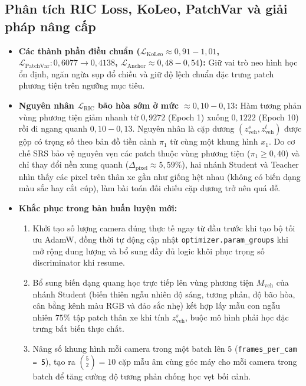 \documentclass[11pt,a4paper]{article}
\begin{document}
\subsection{Phân tích RIC Loss, KoLeo, PatchVar và giải pháp nâng cấp}
\begin{itemize}
    \item \textbf{Các thành phần điều chuẩn ($\mathcal{L}_{\text{KoLeo}} \approx 0{,}91 - 1{,}01$, $\mathcal{L}_{\text{PatchVar}}: 0{,}6077 \to 0{,}4138$, $\mathcal{L}_{\text{Anchor}} \approx 0{,}48 - 0{,}54$):} Giữ vai trò neo hình học ổn định, ngăn ngừa sụp đổ chiều và giữ độ lệch chuẩn đặc trưng patch phương tiện trên ngưỡng mục tiêu.
    \item \textbf{Nguyên nhân $\mathcal{L}_{\text{RIC}}$ bão hòa sớm ở mức $\approx 0{,}10 - 0{,}13$:} Hàm tương phản vùng phương tiện giảm nhanh từ $0{,}9272$ (Epoch 1) xuống $0{,}1222$ (Epoch 10) rồi đi ngang quanh $0{,}10 - 0{,}13$. Nguyên nhân là cặp dương $(z_{\text{veh}}^s, z_{\text{veh}}^t)$ được gộp có trọng số theo bản đồ tiền cảnh $\pi_1$ từ cùng một khung hình $x_1$. Do cơ chế SRS bảo vệ nguyên vẹn các patch thuộc vùng phương tiện ($\pi_1 \ge 0{,}40$) và chỉ thay đổi nền xung quanh ($\Delta_{\text{pixel}} \approx 5{,}59\%$), hai nhánh Student và Teacher nhìn thấy các pixel trên thân xe gần như giống hệt nhau (không có biến dạng màu sắc hay cắt cúp), làm bài toán đối chiếu cặp dương trở nên quá dễ.
    \item \textbf{Khắc phục trong bản huấn luyện mới:}
    \begin{enumerate}
        \item Khởi tạo số lượng camera đúng thực tế ngay từ đầu trước khi tạo bộ tối ưu AdamW, đồng thời tự động cập nhật \texttt{optimizer.param\_groups} khi mở rộng dung lượng và bổ sung đầy đủ logic khôi phục trọng số discriminator khi resume.
        \item Bổ sung biến dạng quang học trực tiếp lên vùng phương tiện $M_{\text{veh}}$ của nhánh Student (biến thiên ngẫu nhiên độ sáng, tương phản, độ bão hòa, cân bằng kênh màu RGB và đảo sắc nhẹ) kết hợp lấy mẫu con ngẫu nhiên $75\%$ tập patch thân xe khi tính $z_{\text{veh}}^s$, buộc mô hình phải học đặc trưng bất biến thực chất.
        \item Nâng số khung hình mỗi camera trong một batch lên $5$ (\texttt{frames\_per\_cam = 5}), tạo ra $\binom{5}{2} = 10$ cặp mẫu âm cùng góc máy cho mỗi camera trong batch để tăng cường độ tương phản chống học vẹt bối cảnh.
    \end{enumerate}
\end{itemize}
\fi
\end{document}
